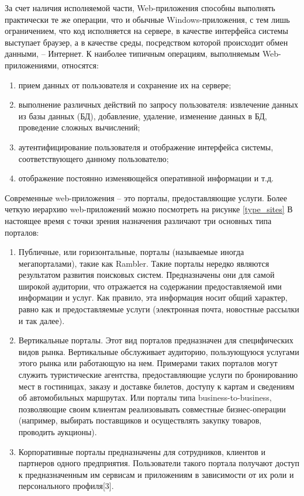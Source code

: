 За счет наличия исполняемой части, Web-приложения способны выполнять практически те же операции, что и обычные Windows-приложения, с тем лишь ограничением, что код исполняется на сервере, в качестве интерфейса системы выступает браузер, а в качестве среды, посредством которой происходит обмен данными, -- Интернет. К наиболее типичным операциям, выполняемым Web-приложениями, относятся:
\begin{enumerate}
\item прием данных от пользователя и сохранение их на сервере;
\item выполнение различных действий по запросу пользователя: извлечение данных из базы данных (БД), добавление, удаление, изменение данных в БД, проведение сложных вычислений;
\item аутентифицирование пользователя и отображение интерфейса системы, соответствующего данному пользователю;
\item отображение постоянно изменяющейся оперативной информации и т.д.
\end{enumerate}

Современные web-приложения -- это порталы, предоставляющие услуги. Более четкую иерархию web-приложений можно посмотреть на рисунке \ref{type_sites}
В настоящее время с точки зрения назначения различают три основных типа порталов:
\begin{enumerate}
\item Публичные, или горизонтальные, порталы (называемые иногда мегапорталами), такие как Rambler. Такие порталы нередко являются результатом развития поисковых систем. Предназначены они для самой широкой аудитории, что отражается на содержании предоставляемой ими информации и услуг. Как правило, эта информация носит общий характер, равно как и предоставляемые услуги (электронная почта, новостные рассылки и так далее).
\item  Вертикальные порталы. Этот вид порталов предназначен для специфических видов рынка. Вертикальные обслуживает аудиторию, пользующуюся услугами этого рынка или работающую на нем. Примерами таких порталов могут служить туристические агентства, предоставляющие услуги по бронированию мест в гостиницах, заказу и доставке билетов, доступу к картам и сведениям об автомобильных маршрутах. Или порталы типа business-to-business, позволяющие своим клиентам реализовывать совместные бизнес-операции (например, выбирать поставщиков и осуществлять закупку товаров, проводить аукционы).
\item Корпоративные порталы предназначены для сотрудников, клиентов и партнеров одного предприятия. Пользователи такого портала получают доступ к предназначенным им сервисам и приложениям в зависимости от их роли и персонального профиля[3].
\end{enumerate}

